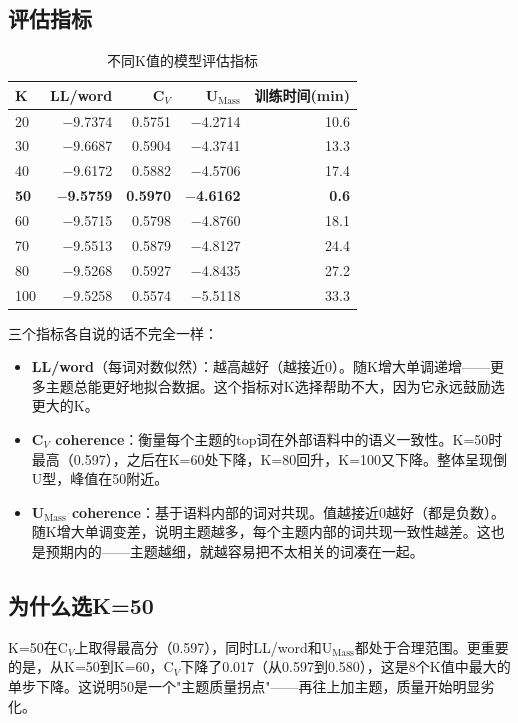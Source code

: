 \documentclass[12pt,a4paper]{ctexart}
\begin{document}
\subsection{评估指标}

\begin{table}[h]
\centering
\small
\begin{tabular}{lrrrr}
\toprule
K & LL/word & C$_V$ & U$_\text{Mass}$ & 训练时间(min) \\
\midrule
20 & $-$9.7374 & 0.5751 & $-$4.2714 & 10.6 \\
30 & $-$9.6687 & 0.5904 & $-$4.3741 & 13.3 \\
40 & $-$9.6172 & 0.5882 & $-$4.5706 & 17.4 \\
\textbf{50} & $-$\textbf{9.5759} & \textbf{0.5970} & $-$\textbf{4.6162} & \textbf{0.6} \\
60 & $-$9.5715 & 0.5798 & $-$4.8760 & 18.1 \\
70 & $-$9.5513 & 0.5879 & $-$4.8127 & 24.4 \\
80 & $-$9.5268 & 0.5927 & $-$4.8435 & 27.2 \\
100 & $-$9.5258 & 0.5574 & $-$5.5118 & 33.3 \\
\bottomrule
\end{tabular}
\caption{不同K值的模型评估指标}
\label{tab:k-metrics}
\end{table}

三个指标各自说的话不完全一样：

\begin{itemize}
\item \textbf{LL/word}（每词对数似然）：越高越好（越接近0）。随K增大单调递增——更多主题总能更好地拟合数据。这个指标对K选择帮助不大，因为它永远鼓励选更大的K。
\item \textbf{C$_V$ coherence}：衡量每个主题的top词在外部语料中的语义一致性。K=50时最高（0.597），之后在K=60处下降，K=80回升，K=100又下降。整体呈现倒U型，峰值在50附近。
\item \textbf{U$_\text{Mass}$ coherence}：基于语料内部的词对共现。值越接近0越好（都是负数）。随K增大单调变差，说明主题越多，每个主题内部的词共现一致性越差。这也是预期内的——主题越细，就越容易把不太相关的词凑在一起。
\end{itemize}

\subsection{为什么选K=50}

K=50在C$_V$上取得最高分（0.597），同时LL/word和U$_\text{Mass}$都处于合理范围。更重要的是，从K=50到K=60，C$_V$下降了0.017（从0.597到0.580），这是8个K值中最大的单步下降。这说明50是一个"主题质量拐点"——再往上加主题，质量开始明显劣化。
\end{document}
